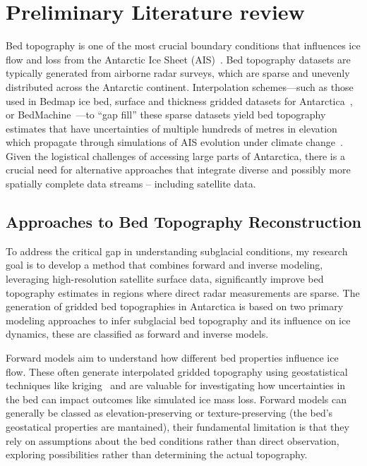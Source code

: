 \chapter{Preliminary Literature review}\label{review}
Bed topography is one of the most crucial boundary conditions that influences ice flow and loss from the Antarctic Ice Sheet (AIS)~\cite{Morlighem_2020}. Bed topography datasets are typically generated from airborne radar surveys, which are sparse and unevenly distributed across the Antarctic continent. Interpolation schemes—such as those used in Bedmap ice bed, surface and thickness gridded datasets for Antarctica~\cite{Lythe_2001, Fretwell_2013, Pritchard_2025}, or BedMachine~\cite{Morlighem_2017}—to ``gap fill'' these sparse datasets yield bed topography estimates that have uncertainties of multiple hundreds of metres in elevation~\cite{Morlighem_2020} which propagate through simulations of AIS evolution under climate change~\cite{Castleman_2022}. Given the logistical challenges of accessing large parts of Antarctica, there is a crucial need for alternative approaches that integrate diverse and possibly more spatially complete data streams – including satellite data.

\section{Approaches to Bed Topography Reconstruction}
To address the critical gap in understanding subglacial conditions, my research goal is to develop a method that combines forward and inverse modeling, leveraging high-resolution satellite surface data, significantly improve bed topography estimates in regions where direct radar measurements are sparse.
The generation of gridded bed topographies in Antarctica is based on two primary modeling approaches to infer subglacial bed topography and its influence on ice dynamics, these are classified as forward and inverse models. 

Forward models aim to understand how different bed properties influence ice flow. These often generate interpolated gridded topography using geostatistical techniques like kriging~\cite{Mackie_2020} and are valuable for investigating how uncertainties in the bed can impact outcomes like simulated ice mass loss. Forward models can generally be classed as elevation-preserving or texture-preserving (the bed's geostatical properties are mantained), their fundamental limitation is that they rely on assumptions about the bed conditions rather than direct observation, exploring possibilities rather than determining the actual topography. 


